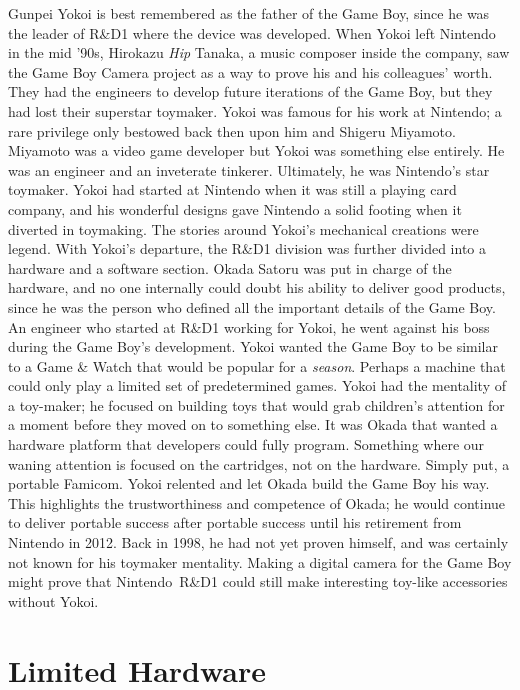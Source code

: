 \documentclass{book}
\begin{document}
Gunpei Yokoi is best remembered as the father of the Game Boy, since he was the leader of R\&D1 where the device was developed. When Yokoi left Nintendo in the mid ’90s, Hirokazu \emph{Hip} Tanaka, a music composer inside the company, saw the Game Boy Camera project as a way to prove his and his colleagues’ worth. They had the engineers to develop future iterations of the Game Boy, but they had lost their superstar toymaker. Yokoi was famous for his work at Nintendo; a rare privilege only bestowed back then upon him and Shigeru Miyamoto. Miyamoto was a video game developer but Yokoi was something else entirely. He was an engineer and an inveterate tinkerer. Ultimately, he was Nintendo’s star toymaker. Yokoi had started at Nintendo when it was still a playing card company, and his wonderful designs gave Nintendo a solid footing when it diverted in toymaking. The stories around Yokoi’s mechanical creations were legend. With Yokoi’s departure, the R\&D1 division was further divided into a hardware and a software section. Okada Satoru was put in charge of the hardware, and no one internally could doubt his ability to deliver good products, since he was the person who defined all the important details of the Game Boy. An engineer who started at R\&D1 working for Yokoi, he went against his boss during the Game Boy’s development. Yokoi wanted the Game Boy to be similar to a Game \& Watch that would be popular for a \emph{season}. Perhaps a machine that could only play a limited set of predetermined games. Yokoi had the mentality of a toy-maker; he focused on building toys that would grab children’s attention for a moment before they moved on to something else. It was Okada that wanted a hardware platform that developers could fully program. Something where our waning attention is focused on the cartridges, not on the hardware. Simply put, a portable Famicom. Yokoi relented and let Okada build the Game Boy his way. This highlights the trustworthiness and competence of Okada; he would continue to deliver portable success after portable success until his retirement from Nintendo in 2012. Back in 1998, he had not yet proven himself, and was certainly not known for his toymaker mentality. Making a digital camera for the Game Boy might prove that Nintendo~R\&D1 could still make interesting toy-like accessories without Yokoi.

\FloatBarrier\needspace{10mm}\section*{Limited Hardware}\nopagebreak[4]
\end{document}
